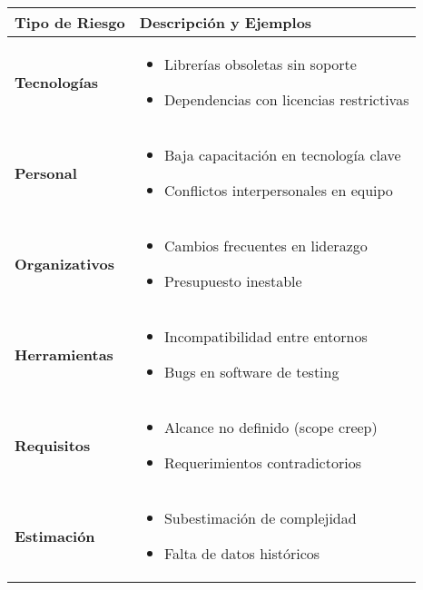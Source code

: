 \begin{center}
    \begin{tabular}{p{3.5cm}p{9cm}}
        \toprule
        \textbf{Tipo de Riesgo} & \textbf{Descripción y Ejemplos} \\
        \midrule
        \textbf{Tecnologías} &
        \begin{itemize}[leftmargin=*]
            \item Librerías obsoletas sin soporte
            \item Dependencias con licencias restrictivas
        \end{itemize} \\
        \midrule
        \textbf{Personal} &
        \begin{itemize}[leftmargin=*]
            \item Baja capacitación en tecnología clave
            \item Conflictos interpersonales en equipo
        \end{itemize} \\
        \midrule
        \textbf{Organizativos} &
        \begin{itemize}[leftmargin=*]
            \item Cambios frecuentes en liderazgo
            \item Presupuesto inestable
        \end{itemize} \\
        \midrule
        \textbf{Herramientas} &
        \begin{itemize}[leftmargin=*]
            \item Incompatibilidad entre entornos
            \item Bugs en software de testing
        \end{itemize} \\
        \midrule
        \textbf{Requisitos} &
        \begin{itemize}[leftmargin=*]
            \item Alcance no definido (scope creep)
            \item Requerimientos contradictorios
        \end{itemize} \\
        \midrule
        \textbf{Estimación} &
        \begin{itemize}[leftmargin=*]
            \item Subestimación de complejidad
            \item Falta de datos históricos
        \end{itemize} \\
        \bottomrule
    \end{tabular}
\end{center}

